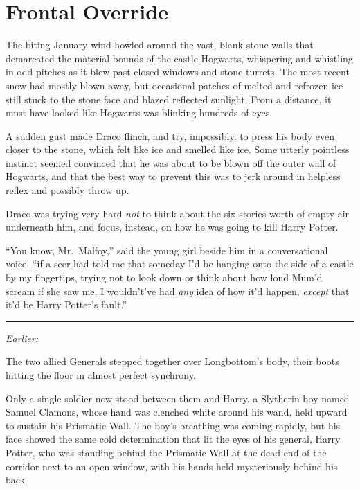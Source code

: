 \chapter{Frontal Override}\label{frontal-override}

The biting January wind howled around the vast, blank stone walls that
demarcated the material bounds of the castle Hogwarts, whispering and
whistling in odd pitches as it blew past closed windows and stone
turrets. The most recent snow had mostly blown away, but occasional
patches of melted and refrozen ice still stuck to the stone face and
blazed reflected sunlight. From a distance, it must have looked like
Hogwarts was blinking hundreds of eyes.

A sudden gust made Draco flinch, and try, impossibly, to press his body
even closer to the stone, which felt like ice and smelled like ice. Some
utterly pointless instinct seemed convinced that he was about to be
blown off the outer wall of Hogwarts, and that the best way to prevent
this was to jerk around in helpless reflex and possibly throw up.

Draco was trying very hard \emph{not} to think about the six stories
worth of empty air underneath him, and focus, instead, on how he was
going to kill Harry Potter.

``You know, Mr.~Malfoy,'' said the young girl beside him in a
conversational voice, ``if a seer had told me that someday I'd be
hanging onto the side of a castle by my fingertips, trying not to look
down or think about how loud Mum'd scream if she saw me, I wouldn't've
had \emph{any} idea of how it'd happen, \emph{except} that it'd be Harry
Potter's fault.''

\begin{center}\rule{3in}{0.4pt}\end{center}

\emph{Earlier:}

The two allied Generals stepped together over Longbottom's body, their
boots hitting the floor in almost perfect synchrony.

Only a single soldier now stood between them and Harry, a Slytherin boy
named Samuel Clamons, whose hand was clenched white around his wand,
held upward to sustain his Prismatic Wall. The boy's breathing was
coming rapidly, but his face showed the same cold determination that lit
the eyes of his general, Harry Potter, who was standing behind the
Prismatic Wall at the dead end of the corridor next to an open window,
with his hands held mysteriously behind his back.

